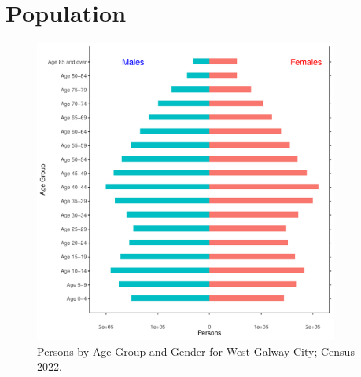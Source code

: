 \documentclass{article}
\begin{document}
\pagebreak

\section{Population} 
\label{sect:Pop}

\begin{figure}[h]
	\centering
	\includegraphics[width = 100mm]{../figures/PyramidPlot.pdf}
	\caption{Persons by Age Group and Gender for West Galway City; Census 2022.}
	\label{fig:2ae19629-1a6a-13a3-e055-000000000001}
	\end{figure}
\end{document}
